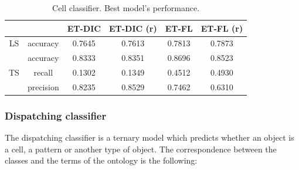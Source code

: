 \begin{table}
	\small
	\center
	\caption{Cell classifier. Dataset size.}
	\label{tab:cell_classif_dataset_size}
\end{table}

\begin{table}
	\small
	\center 
	\begin{tabular}{|c|c|cc|cc|}
		\hline
		& & ET-DIC & ET-DIC (r) & ET-FL & ET-FL (r) \\
		\hline
		LS & accuracy & 0.7645 & 0.7613 & 0.7813 & 0.7873\\
		\hline
		\multirow{3}{*}{TS} & accuracy & 0.8333 & 0.8351 & 0.8696 & 0.8523\\
		& recall & 0.1302 & 0.1349 & 0.4512 & 0.4930 \\
		& precision & 0.8235 & 0.8529 & 0.7462 & 0.6310 \\
		\hline
	\end{tabular}
	\caption{Cell classifier. Best model's performance.}
	\label{tab:cell_classif_best_scores}
\end{table}

\subsubsection{Dispatching classifier}
\label{sssec:thyroid_disp_model}
The dispatching classifier is a ternary model which predicts whether an object is a cell, a pattern or another type of object. The correspondence between the classes and the terms of the ontology is the following:

